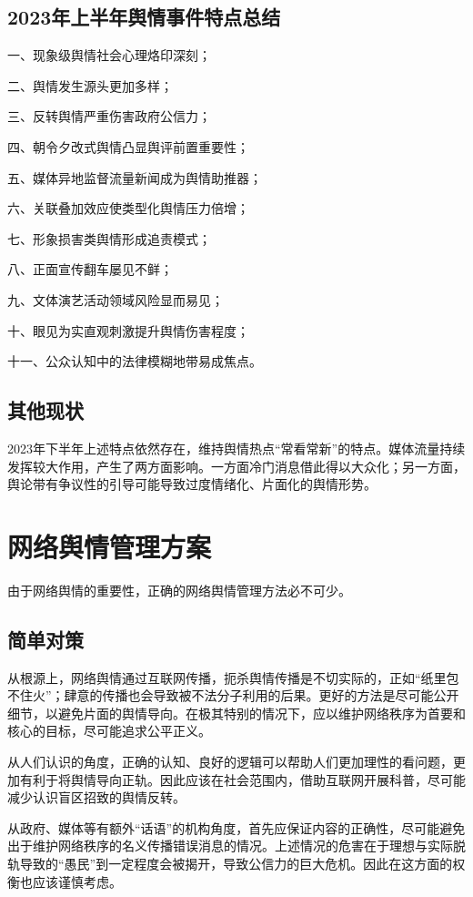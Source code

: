	\section{2023年上半年舆情事件特点总结}
	一、现象级舆情社会心理烙印深刻；\par
	二、舆情发生源头更加多样；\par
	三、反转舆情严重伤害政府公信力；\par
	四、朝令夕改式舆情凸显舆评前置重要性；\par
	五、媒体异地监督流量新闻成为舆情助推器；\par
	六、关联叠加效应使类型化舆情压力倍增；\par
	七、形象损害类舆情形成追责模式；\par
	八、正面宣传翻车屡见不鲜；\par
	九、文体演艺活动领域风险显而易见；\par
	十、眼见为实直观刺激提升舆情伤害程度；\par
	十一、公众认知中的法律模糊地带易成焦点。
	\section{其他现状}
	2023年下半年上述特点依然存在，维持舆情热点“常看常新”的特点。媒体流量持续发挥较大作用，产生了两方面影响。一方面冷门消息借此得以大众化；另一方面，舆论带有争议性的引导可能导致过度情绪化、片面化的舆情形势。
	
	\chapter{网络舆情管理方案}
	由于网络舆情的重要性，正确的网络舆情管理方法必不可少。

	\section{简单对策}
	从根源上，网络舆情通过互联网传播，扼杀舆情传播是不切实际的，正如“纸里包不住火”；肆意的传播也会导致被不法分子利用的后果。更好的方法是尽可能公开细节，以避免片面的舆情导向。在极其特别的情况下，应以维护网络秩序为首要和核心的目标，尽可能追求公平正义。\par
	从人们认识的角度，正确的认知、良好的逻辑可以帮助人们更加理性的看问题，更加有利于将舆情导向正轨。因此应该在社会范围内，借助互联网开展科普，尽可能减少认识盲区招致的舆情反转。\par
	从政府、媒体等有额外“话语”的机构角度，首先应保证内容的正确性，尽可能避免出于维护网络秩序的名义传播错误消息的情况。上述情况的危害在于理想与实际脱轨导致的“愚民”到一定程度会被揭开，导致公信力的巨大危机。因此在这方面的权衡也应该谨慎考虑。